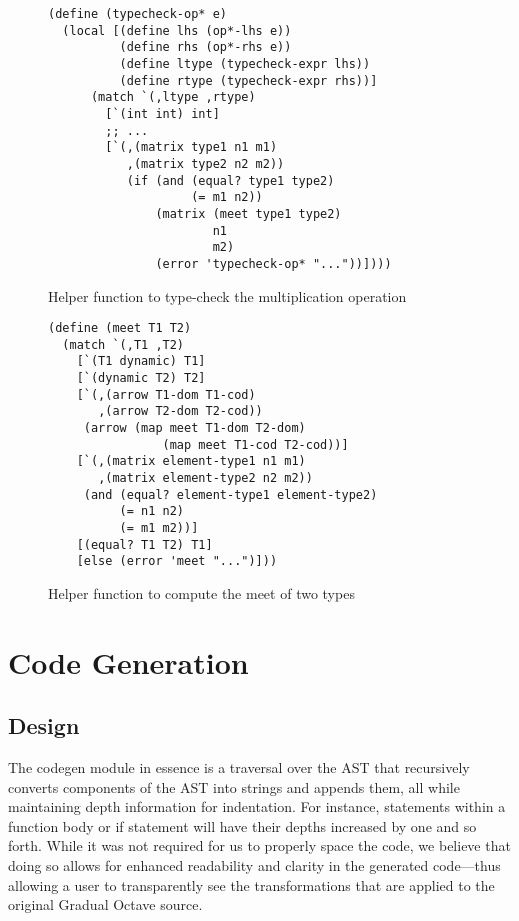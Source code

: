 \begin{figure}[h]
    \begin{lstlisting}[language=racket]
(define (typecheck-op* e)
  (local [(define lhs (op*-lhs e))
          (define rhs (op*-rhs e))
          (define ltype (typecheck-expr lhs))
          (define rtype (typecheck-expr rhs))]
      (match `(,ltype ,rtype)
        [`(int int) int]
        ;; ...
        [`(,(matrix type1 n1 m1)
           ,(matrix type2 n2 m2))
           (if (and (equal? type1 type2)
                    (= m1 n2))
               (matrix (meet type1 type2)
                       n1
                       m2)
               (error 'typecheck-op* "..."))])))
    \end{lstlisting}
    \caption[]{Helper function to type-check the multiplication operation}
    \label{fig:typecheck-op*}
\end{figure}

\begin{figure}[h]
    \begin{lstlisting}[language=racket]
(define (meet T1 T2)
  (match `(,T1 ,T2)
    [`(T1 dynamic) T1]
    [`(dynamic T2) T2]
    [`(,(arrow T1-dom T1-cod)
       ,(arrow T2-dom T2-cod))
     (arrow (map meet T1-dom T2-dom)
                (map meet T1-cod T2-cod))]
    [`(,(matrix element-type1 n1 m1)
       ,(matrix element-type2 n2 m2))
     (and (equal? element-type1 element-type2)
          (= n1 n2)
          (= m1 m2))]
    [(equal? T1 T2) T1]
    [else (error 'meet "...")]))
    \end{lstlisting}
    \caption[]{Helper function to compute the meet of two types}
    \label{fig:meet}
\end{figure}

\section{Code Generation}

\subsection{Design}
The codegen module in essence is a traversal over the AST that recursively converts components of the AST into strings and appends them, all while maintaining depth information for indentation. For instance, statements within a function body or if statement will have their depths increased by one and so forth. While it was not required for us to properly space the code, we believe that doing so allows for enhanced readability and clarity in the generated code---thus allowing a user to transparently see the transformations that are applied to the original Gradual Octave source.

